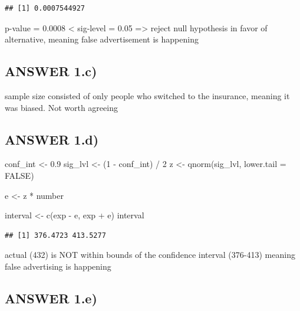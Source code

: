 \documentclass[
]{article}
\newenvironment{Shaded}{\begin{snugshade}}{\end{snugshade}}
\newcommand{\AttributeTok}[1]{\textcolor[rgb]{0.77,0.63,0.00}{#1}}
\newcommand{\ConstantTok}[1]{\textcolor[rgb]{0.00,0.00,0.00}{#1}}
\newcommand{\DecValTok}[1]{\textcolor[rgb]{0.00,0.00,0.81}{#1}}
\newcommand{\FloatTok}[1]{\textcolor[rgb]{0.00,0.00,0.81}{#1}}
\newcommand{\FunctionTok}[1]{\textcolor[rgb]{0.00,0.00,0.00}{#1}}
\newcommand{\NormalTok}[1]{#1}
\newcommand{\OtherTok}[1]{\textcolor[rgb]{0.56,0.35,0.01}{#1}}
\newcommand{\SpecialCharTok}[1]{\textcolor[rgb]{0.00,0.00,0.00}{#1}}
\begin{document}
\begin{verbatim}
## [1] 0.0007544927
\end{verbatim}

p-value = 0.0008 \textless{} sig-level = 0.05 =\textgreater{} reject
null hypothesis in favor of alternative, meaning false advertisement is
happening

\hypertarget{answer-1.c}{%
\subsection{ANSWER 1.c)}\label{answer-1.c}}

sample size consisted of only people who switched to the insurance,
meaning it was biased. Not worth agreeing

\hypertarget{answer-1.d}{%
\subsection{ANSWER 1.d)}\label{answer-1.d}}

\begin{Shaded}
\begin{Highlighting}[]
\NormalTok{conf\_int }\OtherTok{\textless{}{-}} \FloatTok{0.9}
\NormalTok{sig\_lvl }\OtherTok{\textless{}{-}}\NormalTok{ (}\DecValTok{1} \SpecialCharTok{{-}}\NormalTok{ conf\_int)  }\SpecialCharTok{/} \DecValTok{2}
\NormalTok{z }\OtherTok{\textless{}{-}} \FunctionTok{qnorm}\NormalTok{(sig\_lvl, }\AttributeTok{lower.tail =} \ConstantTok{FALSE}\NormalTok{)}

\NormalTok{e }\OtherTok{\textless{}{-}}\NormalTok{ z }\SpecialCharTok{*}\NormalTok{ number}

\NormalTok{interval }\OtherTok{\textless{}{-}} \FunctionTok{c}\NormalTok{(exp }\SpecialCharTok{{-}}\NormalTok{ e, exp }\SpecialCharTok{+}\NormalTok{ e)}
\NormalTok{interval}
\end{Highlighting}
\end{Shaded}

\begin{verbatim}
## [1] 376.4723 413.5277
\end{verbatim}

actual (432) is NOT within bounds of the confidence interval (376-413)
meaning false advertising is happening

\hypertarget{answer-1.e}{%
\subsection{ANSWER 1.e)}\label{answer-1.e}}
\end{document}
